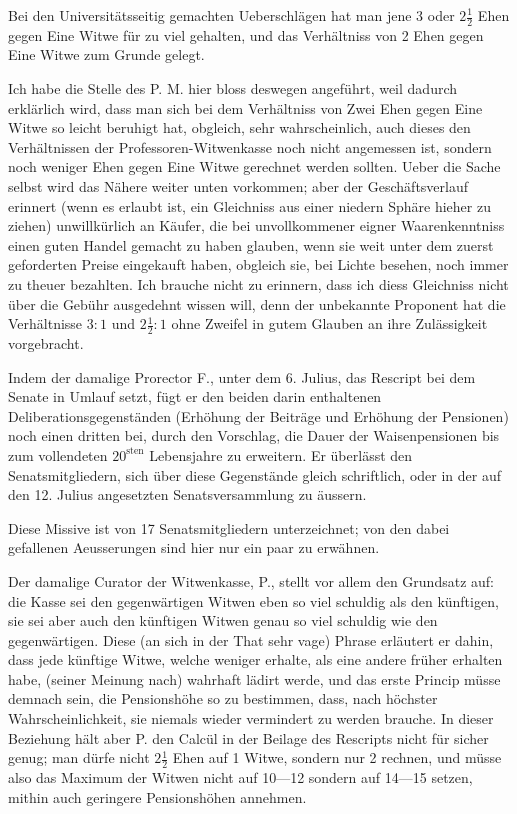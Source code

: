 \par{}
Bei den Universitätsseitig gemachten Ueberschlägen hat man jene 3 oder \(2\tfrac12\) Ehen gegen Eine Witwe für zu viel gehalten, und das Verhältniss von 2 Ehen gegen Eine Witwe zum Grunde gelegt.

Ich habe die Stelle des P. M. hier bloss deswegen angeführt, weil dadurch erklärlich wird, dass man sich bei dem Verhältniss von Zwei Ehen gegen Eine Witwe so leicht beruhigt hat, obgleich, sehr wahrscheinlich, auch dieses den Verhältnissen der Professoren-Witwenkasse noch nicht angemessen ist, sondern noch weniger Ehen gegen Eine Witwe gerechnet werden sollten. Ueber die Sache selbst wird das Nähere weiter unten vorkommen; aber der Geschäftsverlauf erinnert (wenn es erlaubt ist, ein Gleichniss aus einer niedern Sphäre hieher zu ziehen) unwillkürlich an Käufer, die bei unvollkommener eigner Waarenkenntniss einen guten Handel gemacht zu haben glauben, wenn sie weit unter dem zuerst geforderten Preise eingekauft haben, obgleich sie, bei Lichte besehen, noch immer zu theuer bezahlten. Ich brauche nicht zu erinnern, dass ich diess Gleichniss nicht über die Gebühr ausgedehnt wissen will, denn der unbekannte Proponent hat die Verhältnisse \(3:1\) und \(2\tfrac12:1\) ohne Zweifel in gutem Glauben an ihre Zulässigkeit vorgebracht.

Indem der damalige Prorector F., unter dem 6. Julius, das Rescript bei dem Senate in Umlauf setzt, fügt er den beiden darin enthaltenen Deliberationsgegenständen (Erhöhung der Beiträge und Erhöhung der Pensionen) noch einen dritten bei, durch den Vorschlag, die Dauer der Waisenpensionen bis zum vollendeten \(20^{\text{sten}}\) Lebensjahre zu erweitern. Er überlässt den Senatsmitgliedern, sich über diese Gegenstände gleich schriftlich, oder in der auf den 12. Julius angesetzten Senatsversammlung zu äussern.

Diese Missive ist von 17 Senatsmitgliedern unterzeichnet; von den dabei gefallenen Aeusserungen sind hier nur ein paar zu erwähnen.

Der damalige Curator der Witwenkasse, P., stellt vor allem den Grundsatz auf: die Kasse sei den gegenwärtigen Witwen eben so viel schuldig als den künftigen, sie sei aber auch den künftigen Witwen genau so viel schuldig wie den gegenwärtigen. Diese (an sich in der That sehr vage) Phrase erläutert er dahin, dass jede künftige Witwe, welche weniger erhalte, als eine andere früher erhalten habe, (seiner Meinung nach) wahrhaft lädirt werde, und das erste Princip müsse demnach sein, die Pensionshöhe so zu bestimmen, dass, nach höchster Wahrscheinlichkeit, sie niemals wieder vermindert zu werden brauche. In dieser Beziehung hält aber P. den Calcül in der Beilage des Rescripts nicht für sicher genug; man dürfe nicht \(2\tfrac12\) Ehen auf 1 Witwe, sondern nur 2 rechnen, und müsse also das Maximum der Witwen nicht auf 10—12 sondern auf 14—15 setzen, mithin auch geringere Pensionshöhen annehmen.

